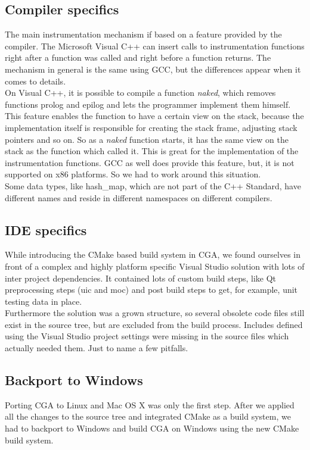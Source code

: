 \subsection{Compiler specifics} The main instrumentation mechanism if based on a feature provided by the compiler. The Microsoft Visual C++ can insert calls to instrumentation functions right after a function was called and right before a function returns. The mechanism in general is the same using GCC, but the differences appear when it comes to details.\\

On Visual C++, it is possible to compile a function \emph{naked}, which removes functions prolog and epilog and lets the programmer implement them himself. This feature enables the function to have a certain view on the stack, because the implementation itself is responsible for creating the stack frame, adjusting stack pointers and so on. So as a \emph{naked} function starts, it has the same view on the stack as the function which called it. This is great for the implementation of the instrumentation functions. GCC as well does provide this feature, but, it is not supported on x86 platforms. So we had to work around this situation.\\

Some data types, like hash\_map, which are not part of the C++ Standard, have different names and reside in different namespaces on different compilers.

\subsection{IDE specifics} While introducing the CMake based build system in CGA, we found ourselves in front of a complex and highly platform specific Visual Studio solution with lots of inter project dependencies. It contained lots of custom build steps, like Qt preprocessing steps (uic and moc) and post build steps to get, for example, unit testing data in place.\\

Furthermore the solution was a grown structure, so several obsolete code files still exist in the source tree, but are excluded from the build process. Includes defined using the Visual Studio project settings were missing in the source files which actually needed them. Just to name a few pitfalls.

\subsection{Backport to Windows} Porting CGA to Linux and Mac OS X was only the first step. After we applied all the changes to the source tree and integrated CMake as a build system, we had to backport to Windows and build CGA on Windows using the new CMake build system.

